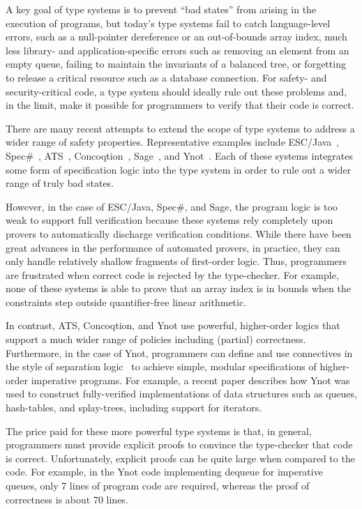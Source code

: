 \documentclass[preprint,nocopyrightspace]{sigplanconf}
\begin{document}
A key goal of type systems is to prevent ``bad states'' from arising
in the execution of programs, but today's type systems fail to catch
language-level errors, such as a null-pointer dereference or an
out-of-bounds array index, much less library- and application-specific
errors such as removing an element from an empty queue, failing to
maintain the invariants of a balanced tree, or forgetting to release a
critical resource such as a database connection.  For safety- and
security-critical code, a type system should ideally rule out these
problems and, in the limit, make it possible for programmers to verify
that their code is correct.

There are many recent attempts to extend the scope of type systems to
address a wider range of safety properties.  Representative examples
include ESC/Java~\cite{esc-java}, Spec\#~\cite{spec-sharp},
ATS~\cite{ats}, Concoqtion~\cite{concoqtion}, Sage~\cite{sage}, and
Ynot~\cite{ynot:icfp}.  Each of these systems integrates some form of
specification logic into the type system in order to rule out a wider
range of truly bad states.

However, in the case of ESC/Java, Spec\#, and Sage, the program logic
is too weak to support full verification because these systems rely
completely upon provers to automatically discharge verification conditions.
While there have been great advances in the performance of automated
provers, in practice, they can only handle relatively shallow
fragments of first-order logic.  Thus, programmers are frustrated when
correct code is rejected by the type-checker.  For example,
none of these systems is able to prove that an array index is in
bounds when the constraints step outside quantifier-free
linear arithmetic.

In contrast, ATS, Concoqtion, and Ynot use powerful, higher-order
logics that support a much wider range of policies including (partial)
correctness.  Furthermore, in the case of Ynot, programmers can define
and use connectives in the style of separation logic~\cite{separation}
to achieve simple, modular specifications of higher-order imperative
programs.  For example, a recent paper describes how Ynot was used
to construct fully-verified implementations of data structures such
as queues, hash-tables, and splay-trees, including support for 
iterators.  

The price paid for these more powerful type systems is that, in
general, programmers must provide explicit proofs to convince the
type-checker that code is correct.  Unfortunately, explicit proofs can
be quite large when compared to the code.  For example, in the Ynot
code implementing dequeue for imperative queues, only 7 lines of
program code are required, whereas the proof of correctness is about
70 lines.
\end{document}
